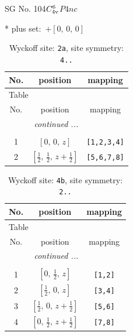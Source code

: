 \documentclass[fleqn,8pt]{jsarticle}
\begin{document}
\setcounter{MaxMatrixCols}{32}

\renewcommand{\tablename}{Table~}
\renewcommand{\figurename}{Figure~}
\begin{center}
\LARGE
SG No. 104\quad$C_{\rm 4v}^{6}$\quad$P4nc$\quad[ tetragonal ]
\end{center}
* plus set:\,\,\,$+\left[ 0,\, 0,\, 0 \right]$
\renewcommand{\arraystretch}{1.2}
\begin{longtable}{ccc}
\caption{Wyckoff site: {\tt 2a}, site symmetry: {\tt 4..}}
 \\
 \hline \hline
No. & position & mapping \\ \hline \endfirsthead

\multicolumn{2}{l}{\tablename\ \thetable{}} \\
 \hline \hline
No. & position & mapping \\ \hline \endhead

 \hline \hline
\multicolumn{2}{r}{\footnotesize\it continued ...} \\ \endfoot

 \hline \hline
\multicolumn{2}{r}{} \\ \endlastfoot

1 & $\left[ 0,\, 0,\, z \right]$ & {\tt [1,2,3,4]} \\ \hline
2 & $\left[ \frac{1}{2},\, \frac{1}{2},\, z + \frac{1}{2} \right]$ & {\tt [5,6,7,8]} \\
\end{longtable}
\renewcommand{\arraystretch}{1.2}
\begin{longtable}{ccc}
\caption{Wyckoff site: {\tt 4b}, site symmetry: {\tt 2..}}
 \\
 \hline \hline
No. & position & mapping \\ \hline \endfirsthead

\multicolumn{2}{l}{\tablename\ \thetable{}} \\
 \hline \hline
No. & position & mapping \\ \hline \endhead

 \hline \hline
\multicolumn{2}{r}{\footnotesize\it continued ...} \\ \endfoot

 \hline \hline
\multicolumn{2}{r}{} \\ \endlastfoot

1 & $\left[ 0,\, \frac{1}{2},\, z \right]$ & {\tt [1,2]} \\ \hline
2 & $\left[ \frac{1}{2},\, 0,\, z \right]$ & {\tt [3,4]} \\ \hline
3 & $\left[ \frac{1}{2},\, 0,\, z + \frac{1}{2} \right]$ & {\tt [5,6]} \\ \hline
4 & $\left[ 0,\, \frac{1}{2},\, z + \frac{1}{2} \right]$ & {\tt [7,8]} \\
\end{longtable}
\end{document}
